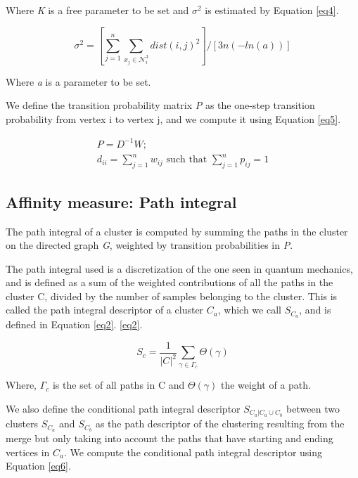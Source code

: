 \documentclass[
	10pt,
	parskip=half-,	
	paper=a4,
	english
	]{scrartcl}
\begin{document}
Where \textit{K} is a free parameter to be set and \(\sigma^2\) is estimated by Equation \ref{eq4}.

\begin{equation}
    \sigma^2 = [\sum_{j=1}^{n}\sum_{x_j\in \mathcal{N}_i^3}dist(i,j)^2] / [3n(-ln(a))]
    \label{eq4}    
\end{equation}

Where \textit{a} is a parameter to be set.

We define the transition probability matrix \textit{P} as the one-step transition probability from vertex i to vertex j, and we compute it using Equation \ref{eq5}.

\begin{equation}
    \begin{split}
    P = D^{-1}W; 
    \\
    d_{ii} = \sum_{j=1}^n w_{ij}
    \text{ such that }
    \sum_{j=1}^n p_{ij}=1
    \end{split}
    \label{eq5}
\end{equation}

\subsection{Affinity measure: Path integral}

The path integral of a cluster is computed by summing the paths in the cluster on the directed graph \textit{G}, weighted by transition probabilities in \textit{P}.

The path integral used is a discretization of the one seen in quantum mechanics, and is defined as a sum of the weighted contributions of all the paths in the cluster C, divided by the number of samples belonging to the cluster. This is called the path integral descriptor of a cluster \(C_a\), which we call \(S_{C_a}\), and is defined in Equation \ref{eq2}.
\ref{eq2}.

\begin{equation}
    S_c = \frac{1}{|C|^2}\sum_{\gamma\in\Gamma_c}{\Theta(\gamma)}
\label{eq2}
\end{equation}

Where, \(\Gamma_c\) is the set of all paths in C and \(\Theta(\gamma)\) the weight of a path.

We also define the conditional path integral descriptor \(S_{C_a|C_a\cup C_b}\) between two clusters \(S_{C_a}\) and \(S_{C_b}\) as the path descriptor of the clustering resulting from the merge but only taking into account the paths that have starting and ending vertices in \(C_a\). We compute the conditional path integral descriptor using Equation \ref{eq6}.
\end{document}
